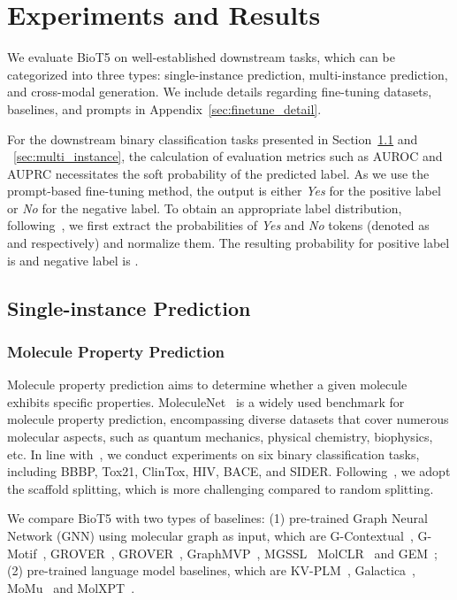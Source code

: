 \documentclass[11pt]{article}
\newcommand{\method}{{BioT5}}
\begin{document}
\section{Experiments and Results}
We evaluate \method{} on  well-established downstream tasks, which can be categorized into three types: single-instance prediction, multi-instance prediction, and cross-modal generation.
We include details regarding fine-tuning datasets, baselines, and prompts in Appendix~\ref{sec:finetune_detail}.

For the downstream binary classification tasks presented in Section~\ref{sec:single_instance} and ~\ref{sec:multi_instance}, the calculation of evaluation metrics such as AUROC and AUPRC necessitates the soft probability of the predicted label.
As we use the prompt-based fine-tuning method, the output is either \textit{Yes} for the positive label or \textit{No} for the negative label.
To obtain an appropriate label distribution, following~\citet{liu2023molxpt}, we first extract the probabilities of \textit{Yes} and \textit{No} tokens (denoted as  and  respectively) and normalize them.
The resulting probability for positive label is  and negative label is .

\subsection{Single-instance Prediction}
\label{sec:single_instance}
\subsubsection{Molecule Property Prediction}
\label{sec:molecule_property}
Molecule property prediction aims to determine whether a given molecule exhibits specific properties.
MoleculeNet~\citep{wu2018moleculenet} is a widely used benchmark for molecule property prediction, encompassing diverse datasets that cover numerous molecular aspects, such as quantum mechanics, physical chemistry, biophysics, etc.
In line with~\citet{liu2023molxpt}, we conduct experiments on six binary classification tasks, including BBBP, Tox21, ClinTox, HIV, BACE, and SIDER.
Following~\citep{fang2022geometry}, we adopt the scaffold splitting, which is more challenging compared to random splitting.

We compare \method{} with two types of baselines:
(1) pre-trained Graph Neural Network (GNN) using molecular graph as input, which are G-Contextual~\citep{rong2020self}, G-Motif~\citep{rong2020self}, GROVER~\citep{rong2020self}, GROVER~\citep{rong2020self}, GraphMVP~\citep{DBLP:conf/iclr/LiuWLLGT22}, MGSSL~\citep{zhang2021motif} MolCLR~\citep{wang2022molecular} and GEM~\citep{fang2022geometry};
(2) pre-trained language model baselines, which are KV-PLM~\citep{zeng2022deep}, Galactica~\citep{taylor2022galactica}, MoMu~\citep{su2022molecular} and MolXPT~\cite{liu2023molxpt}.
\end{document}
